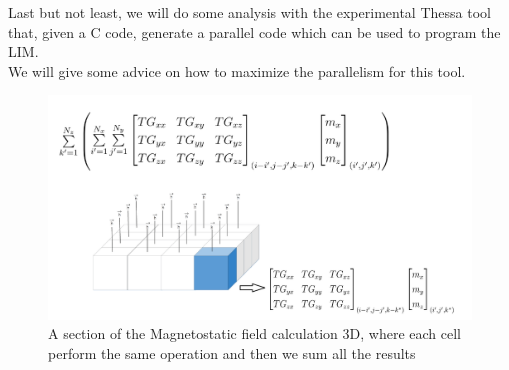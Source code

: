 \documentclass[12pt]{report}
\begin{document}
Last but not least, we will do some analysis with the experimental Thessa tool that, given a C code,  generate a parallel code which can be used to program the LIM.\\
We will give some advice on how to maximize the parallelism for this tool.

\begin{figure}[h!]
	\centering
	\includegraphics[width=\textwidth]{imm/3d.png}  
	\caption{A section of the Magnetostatic field calculation 3D, where each cell perform the same operation and then we sum all the results} 
	\label{3dpreview}
\end{figure}
 	
	 
	
\end{document}
